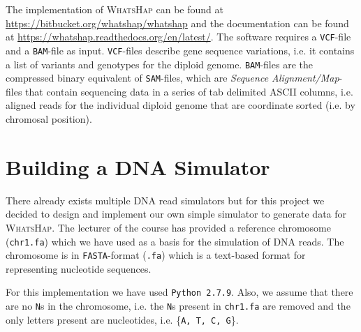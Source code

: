 \documentclass[10pt,a4paper]{article}
\begin{document}
The implementation of \textsc{WhatsHap} can be found at \url{https://bitbucket.org/whatshap/whatshap} and the documentation can be found at \url{https://whatshap.readthedocs.org/en/latest/}. The software requires a \texttt{VCF}-file and a \texttt{BAM}-file as input. \texttt{VCF}-files describe gene sequence variations, i.e. it contains a list of variants and genotypes for the diploid genome. \texttt{BAM}-files are the compressed binary equivalent of \texttt{SAM}-files, which are \textit{Sequence Alignment/Map}-files that contain sequencing data in a series of tab delimited ASCII columns, i.e. aligned reads for the individual diploid genome that are coordinate sorted (i.e. by chromosal position).

\section{Building a DNA Simulator}
There already exists multiple DNA read simulators but for this project we decided to design and implement our own simple simulator to generate data for \textsc{WhatsHap}. The lecturer of the course has provided a reference chromosome (\texttt{chr1.fa}) which we have used as a basis for the simulation of DNA reads. The chromosome is in \texttt{FASTA}-format (\texttt{.fa}) which is a text-based format for representing nucleotide sequences.

For this implementation we have used \texttt{Python 2.7.9}. Also, we assume that there are no \texttt{N}s in the chromosome, i.e. the \texttt{N}s present in \texttt{chr1.fa} are removed and the only letters present are nucleotides, i.e. \{\texttt{A, T, C, G}\}.
\end{document}
